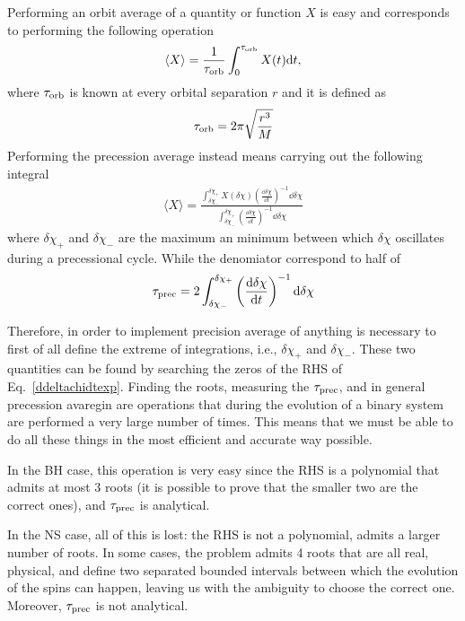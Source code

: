 \documentclass[floats,floatfix,showpacs,amssymb,prd,twocolumn,superscriptaddress,nofootinbib,nolongbibliography,reprint,onecolumn]{revtex4-2}
\newcommand{\deltachi}{\delta \chi}
\begin{document}
Performing an orbit average of a quantity or function $X$ is easy and corresponds to performing the following operation
\begin{align}
\langle X \rangle = \frac{1}{\tau_{\rm orb}} \int_0^{\tau_{\rm orb}} X(t)  \dd t,
\end{align}
where $\tau_{\rm orb}$ is known at every  orbital separation $r$ and it is defined as
\begin{align}\label{torb}
\tau_{\rm orb} =2 \pi \sqrt{\frac{r^3}{M}} 
\end{align}
Performing the precession average instead means carrying out the following integral
\begin{align}\label{precession average}
\langle X \rangle =\frac{\int_{\delta\chi_-}^{\delta\chi_+} X(\deltachi)\left(\frac{\dd \deltachi }{\dd t}\right)^{-1} \dd \deltachi}{\int_{\delta\chi_-}^{\delta\chi_+} \left(\frac{\dd \deltachi }{\dd t}\right)^{-1} \dd \deltachi}
\end{align}
where $\delta\chi_+$ and $\delta\chi_-$ are the maximum an minimum between which $\deltachi$ oscillates during a precessional cycle. While the denomiator correspond to half of
\begin{align}\label{tprec}
\tau_{\rm prec} =2 \int_{\delta\chi_-}^{\delta\chi_+} \left(\frac{\dd \deltachi }{\dd t}\right)^{-1} \dd \deltachi
\end{align}

Therefore, in order to implement precision average of anything is necessary to first of all define the extreme of integrations, i.e., $\delta\chi_+$ and $\delta\chi_-$. These two quantities can be found by searching the zeros of the RHS of Eq.~\ref{ddeltachidtexp}.
Finding the roots, measuring the $\tau_{\rm prec}$, and in general precession avaregin are operations that during the evolution of a binary system are performed a very large number of times. This means that we must be able to do all these things in the most efficient and accurate way possible.

In the BH case, this operation is very easy since the RHS is a polynomial that admits at most 3 roots (it is possible to prove that the smaller two are the correct ones), and $\tau_{\rm prec}$ is analytical.

In the NS case, all of this is lost: the RHS is not a polynomial, admits a larger number of roots. In some cases, the problem admits 4 roots that are all real, physical, and define two separated bounded intervals between which the evolution of the spins can happen, leaving us with the ambiguity to choose the correct one. Moreover, $\tau_{\rm prec}$ is not analytical.
\end{document}
